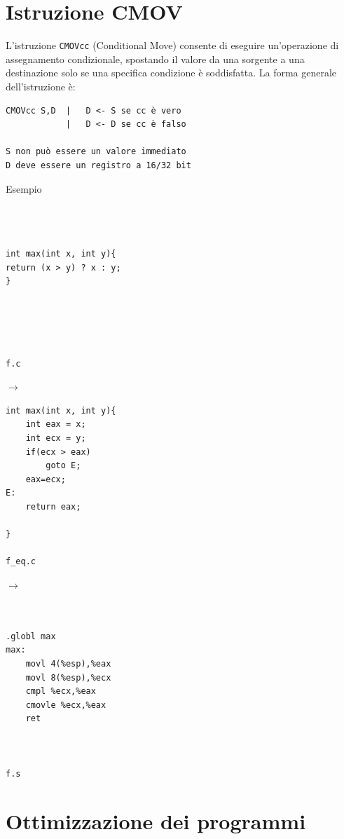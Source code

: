 \section{Istruzione CMOV}
L'istruzione \texttt{CMOVcc} (Conditional Move) consente di eseguire un'operazione 
di assegnamento condizionale, spostando il valore da una sorgente a una destinazione 
solo se una specifica condizione è soddisfatta. La forma generale dell'istruzione è:
\begin{verbatim}
CMOVcc S,D  |   D <- S se cc è vero
            |   D <- D se cc è falso

S non può essere un valore immediato
D deve essere un registro a 16/32 bit
\end{verbatim}
\noindent Esempio\\
\begin{minipage}{0.3\textwidth}
    \begin{verbatim}



int max(int x, int y){
return (x > y) ? x : y;
}





f.c
    \end{verbatim}
\end{minipage}
\hfill
$\longrightarrow$
\hfill
\begin{minipage}{0.3\textwidth}
    \begin{verbatim}
int max(int x, int y){
    int eax = x;
    int ecx = y;
    if(ecx > eax) 
        goto E;
    eax=ecx;
E:
    return eax;
    
}

f_eq.c
    \end{verbatim}
\end{minipage}
\hfill
$\longrightarrow$
\hfill
\begin{minipage}{0.3\textwidth}
    \begin{verbatim}


.globl max
max:
    movl 4(%esp),%eax
    movl 8(%esp),%ecx
    cmpl %ecx,%eax
    cmovle %ecx,%eax  
    ret



f.s
    \end{verbatim} 
\end{minipage}
\section{Ottimizzazione dei programmi}

